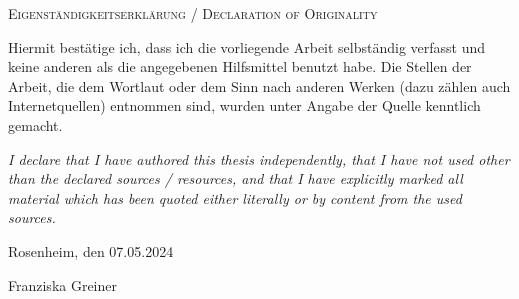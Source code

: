 \cleardoubleemptypage

{

\thispagestyle{empty}
\vspace*{\fill}

\noindent
\textsc{Eigenständigkeitserklärung / Declaration of Originality}

\medskip

\noindent
Hiermit bestätige ich, dass ich die vorliegende Arbeit selbständig verfasst und keine anderen als die angegebenen Hilfsmittel benutzt habe. Die Stellen der Arbeit, die dem Wortlaut oder dem Sinn nach anderen Werken (dazu zählen auch Internetquellen) entnommen sind, wurden unter Angabe der Quelle kenntlich gemacht.

\medskip

\textit{I declare that I have authored this thesis independently, that I have not used other than the declared sources / resources, and that I have explicitly marked all material which has been quoted either literally or by content from the used sources.}

\bigskip

\noindent
Rosenheim, den 07.05.2024

\vspace*{2cm}

\noindent
Franziska Greiner
}

